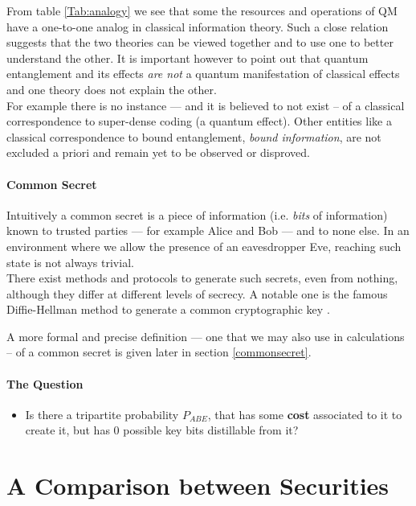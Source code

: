 From table \ref{Tab:analogy} we see that some the resources and operations of QM have a one-to-one analog in classical information theory. 
Such a close relation suggests that the two theories can be viewed together and to use one to better understand the other. 
It is important however to point out that quantum entanglement and its effects \emph{are not} a quantum manifestation of classical effects and one theory does not explain the other. \\
For example there is no instance --- and it is believed to not exist -- of a classical correspondence to super-dense coding (a quantum effect). Other entities like a classical correspondence to bound entanglement, \emph{bound information}, are not excluded a priori and remain yet to be observed or disproved.

\paragraph*{Common Secret}
Intuitively a common secret is a piece of information (i.e. \textit{bits} of information) known to trusted parties --- for example Alice and Bob --- and to none else. 
In an environment where we allow the presence of an eavesdropper Eve, reaching such state is not always trivial. \\
There exist methods and protocols to generate such secrets, even from nothing, although they differ at different levels of secrecy. A notable one is the famous Diffie-Hellman method to generate a common cryptographic key \cite{DH76} .

A more formal and precise definition --- one that we may also use in calculations -- of a common secret is given later in section \ref{commonsecret}.
\\

\paragraph*{The Question}
\begin{itemize}
		\item Is there a tripartite probability $P_{ABE}$, that has some \textbf{cost} associated to it to create it, but has $0$ possible key bits distillable from it? 
\end{itemize}

\section{A Comparison between Securities}

